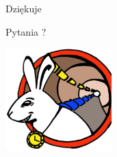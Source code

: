 \documentclass[compress,red]{beamer}
\begin{document}
\begin{frame}{Dziękuje}

    \begin{center}
    Pytania ?
    \end{center}

    
    \begin{center}
    \includegraphics[height=4.0cm]{../../figures/logo/WRlogo.ps}
    \end{center}

\end{frame}
\end{document}
